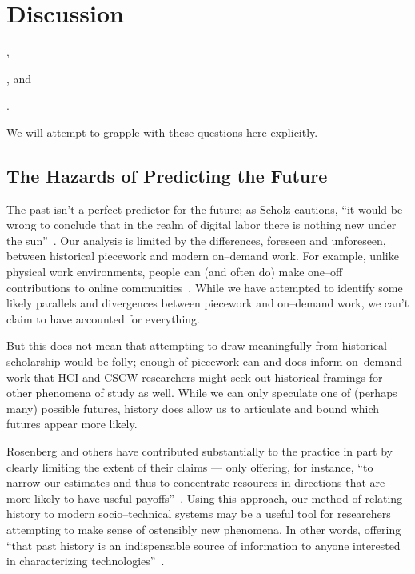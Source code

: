 \documentclass[pn4226]{subfiles}
\begin{document}
\section{Discussion}
\begin{inlinelist}
  \item {},
  \item {}, and
  \item {}.
\end{inlinelist}
We will attempt to grapple with these questions here explicitly.


\subsection{The Hazards of Predicting the Future}\label{sec:perilousProblemsPredicting}
The past isn't a perfect predictor for the future;
as Scholz cautions,
``it would be wrong to conclude that in the realm of digital labor there is nothing new under the sun''~\cite{scholz2012digital}.
Our analysis is limited by the differences, foreseen and unforeseen, between historical piecework and modern on--demand work.
For example, unlike physical work environments, people can (and often do) make one--off contributions to online communities~\cite{mcinnis2016one}.
While we have attempted to identify some likely parallels and divergences between piecework and on--demand work,
we can't claim to have accounted for everything.

But this does not mean that attempting to draw meaningfully from historical scholarship would be folly;
enough of piecework can and does inform on--demand work that
HCI and CSCW researchers might seek out historical framings for other phenomena of study as well.
While we can only speculate one of (perhaps many) possible futures, history does allow us to articulate and bound which futures appear more likely.

Rosenberg and others have contributed substantially to the practice in part by clearly limiting the extent of their claims
--- only offering, for instance,
``to narrow our estimates and thus to concentrate resources in directions that are more likely to have useful payoffs''~\cite{rosenberg1994exploring}.
Using this approach,
our method of relating history to modern socio--technical systems may be
a useful tool for researchers attempting
to make sense of ostensibly new phenomena.
In other words, offering ``that past history is an indispensable source of information
to anyone interested in characterizing technologies''~\cite{rosenberg1982inside}.
\end{document}

